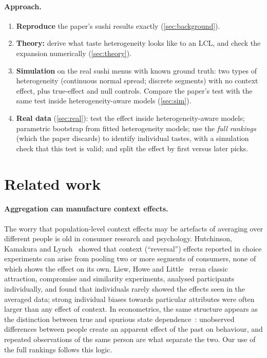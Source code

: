 \documentclass[11pt,a4paper]{article}
\theoremstyle{remark}
\begin{document}
\paragraph{Approach.}
\begin{enumerate}
\item \textbf{Reproduce} the paper's sushi results exactly (\cref{sec:background}).
\item \textbf{Theory:} derive what taste heterogeneity looks like to an LCL, and check the expansion
      numerically (\cref{sec:theory}).
\item \textbf{Simulation} on the real sushi menus with known ground truth: two types of heterogeneity
      (continuous normal spread; discrete segments) with no context effect, plus true-effect and null
      controls. Compare the paper's test with the same test inside heterogeneity-aware models
      (\cref{sec:sim}).
\item \textbf{Real data} (\cref{sec:real}): test the effect inside heterogeneity-aware models; parametric
      bootstrap from fitted heterogeneity models; use the \emph{full rankings} (which the paper discards)
      to identify individual tastes, with a simulation check that this test is valid; and split the
      effect by first versus later picks.
\end{enumerate}

\section{Related work}
\label{sec:related}

\paragraph{Aggregation can manufacture context effects.}
The worry that population-level context effects may be artefacts of averaging over different people is
old in consumer research and psychology. Hutchinson, Kamakura and Lynch~\cite{hkl00} showed that context
(``reversal'') effects reported in choice experiments can arise from pooling two or more segments of
consumers, none of which shows the effect on its own. Liew, Howe and Little~\cite{lhl16} reran classic
attraction, compromise and similarity experiments, analysed participants individually, and found that
individuals rarely showed the effects seen in the averaged data; strong individual biases towards
particular attributes were often larger than any effect of context. In econometrics, the same structure
appears as the distinction between true and spurious state dependence~\cite{heckman81}: unobserved
differences between people create an apparent effect of the past on behaviour, and repeated observations
of the same person are what separate the two. Our use of the full rankings follows this logic.
\end{document}
